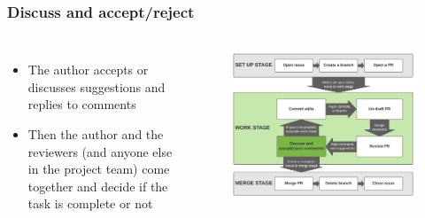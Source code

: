 \documentclass[aspectratio=169]{beamer} %
\begin{document}
\begin{frame}
	\frametitle{Discuss and accept/reject}
	\begin{columns}[c]
		
		\begin{itemize}
			\setlength\itemsep{1em}
			\item The author accepts or discusses suggestions and replies to comments
			\item Then the author and the reviewers (and anyone else in the project team) come together and decide if the task is complete or not
		\end{itemize}
		
		\vspace{-.75cm}
		\begin{figure}
			\centering
			\includegraphics[width=\textwidth]{./img/branch-pr-merge-cycle-S2-4.png}
		\end{figure}
		
	\end{columns}
\end{frame}
\end{document}
